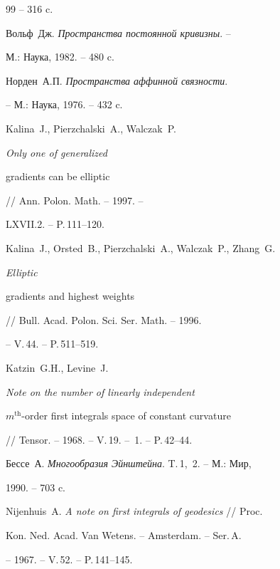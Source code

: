 \begin{thebibliography}{99}
-- 316 c.




Вольф~Дж. {\it Пространства постоянной кривизны}. --


М.: Наука, 1982. -- 480 c.




Норден~А.П. {\it Пространства аффинной связности}.


-- М.: Наука, 1976. -- 432 c.




Kalina~J., Pierzchalski~A., Walczak~P. {\it Only one of generalized


gradients can be elliptic} // Ann. Polon. Math. -- 1997. --


LXVII.2. -- P.\,111--120.




Kalina~J., Orsted~B., Pierzchalski~A., Walczak~P., Zhang~G. {\it Elliptic


gradients and highest weights} // Bull. Acad. Polon. Sci. Ser. Math. -- 1996.


-- V.\,44. -- P.\,511--519.




Katzin~G.H., Levine~J. {\it Note on the number of linearly independent


$m^{\mathrm{th}}$-order first integrals space of constant curvature}


// Tensor. -- 1968. -- V.\,19. -- \No\,1. -- P.\,42--44.




Бессе~А. {\it Многообразия Эйнштейна}. T.\,1,~2. -- М.: Мир,


1990. -- 703 c.




Nijenhuis~A. {\it A note on first integrals of geodesics} // Proc.


Kon. Ned. Acad. Van Wetens. -- Amsterdam. -- Ser.\,A.


-- 1967. -- V.\,52. -- P.\,141--145.


\end{thebibliography}





\vskip 2cm














\label{end}





